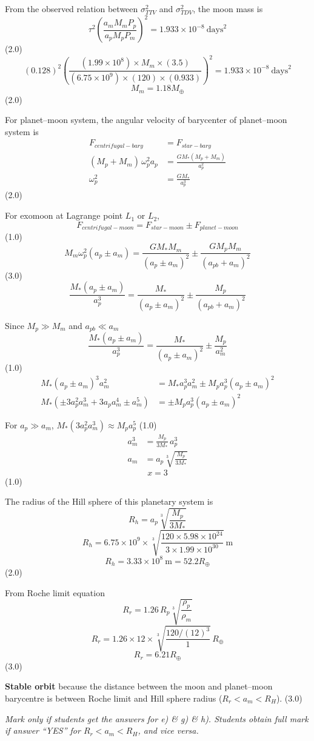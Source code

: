 \begin{description}
From the observed relation between $\sigma_{TTV}^2$ and $\sigma_{TDV}^2$, the
moon mass is
\[ \tau^2\left(\frac{a_m M_m P_p}{a_p M_p P_m}\right)^2
   = 1.933\times10^{-8}\ \mathrm{days}^2 \]
\hfill(2.0)
\[ (0.128)^2\left(\frac{(1.99\times10^{8})\times M_m\times(3.5)}
   {(6.75\times10^{9})\times(120)\times(0.933)}\right)^2
   = 1.933\times10^{-8}\ \mathrm{days}^2 \]
\[ M_m = 1.18 M_\oplus \]
\hfill(2.0)

\item[(f)] For planet--moon system, the angular velocity of barycenter of
planet--moon system is
\begin{align*}
F_{centrifugal-bary} &= F_{star-bary}\\
(M_p + M_m)\,\omega_p^2 a_p &= \frac{GM_*(M_p + M_m)}{a_p^2}\\
\omega_p^2 &= \frac{GM_*}{a_p^3}
\end{align*}
\hfill(2.0)

For exomoon at Lagrange point $L_1$ or $L_2$,
\[ F_{centrifugal-moon} = F_{star-moon} \pm F_{planet-moon} \]
\hfill(1.0)
\[ M_m\omega_p^2(a_p \pm a_m)
   = \frac{GM_*M_m}{(a_p \pm a_m)^2} \pm \frac{GM_pM_m}{(a_{pb}+a_m)^2} \]
\hfill(3.0)
\[ \frac{M_*(a_p \pm a_m)}{a_p^3}
   = \frac{M_*}{(a_p \pm a_m)^2} \pm \frac{M_p}{(a_{pb}+a_m)^2} \]

Since $M_p \gg M_m$ and $a_{pb} \ll a_m$
\[ \frac{M_*(a_p \pm a_m)}{a_p^3}
   = \frac{M_*}{(a_p \pm a_m)^2} \pm \frac{M_p}{a_m^2} \]
\hfill(1.0)
\begin{align*}
M_*(a_p \pm a_m)^3 a_m^2 &= M_*a_p^3 a_m^2 \pm M_p a_p^3 (a_p \pm a_m)^2\\
M_*(\pm 3a_p^2 a_m^3 + 3a_p a_m^4 \pm a_m^5)
  &= \pm M_p a_p^3 (a_p \pm a_m)^2
\end{align*}

For $a_p \gg a_m$, $M_*(3a_p^2 a_m^3) \approx M_p a_p^5$ \hfill(1.0)
\begin{align*}
a_m^3 &= \frac{M_p}{3M_*}\,a_p^3\\
a_m &= a_p\sqrt[3]{\frac{M_p}{3M_*}}
\end{align*}
\[ x = 3 \]
\hfill(1.0)

The radius of the Hill sphere of this planetary system is
\[ R_h = a_p\sqrt[3]{\frac{M_p}{3M_*}} \]
\[ R_h = 6.75\times10^{9}\times
   \sqrt[3]{\frac{120\times5.98\times10^{24}}{3\times1.99\times10^{30}}}
   \ \mathrm{m} \]
\[ R_h = 3.33\times10^{8}\ \mathrm{m} = 52.2 R_\oplus \]
\hfill(2.0)

\item[(g)] From Roche limit equation
\[ R_r = 1.26\,R_p\sqrt[3]{\frac{\rho_p}{\rho_m}} \]
\[ R_r = 1.26\times12\times\sqrt[3]{\frac{120/(12)^3}{1}}\,R_\oplus \]
\[ R_r = 6.21 R_\oplus \]
\hfill(3.0)

\item[(h)] \textbf{Stable orbit} because the distance between the moon and
planet--moon barycentre is between Roche limit and Hill sphere radius
($R_r < a_m < R_H$). \hfill(3.0)

\textit{Mark only if students get the answers for e) \& g) \& h). Students
obtain full mark if answer ``YES'' for $R_r < a_m < R_H$, and vice versa.}
\end{description}


